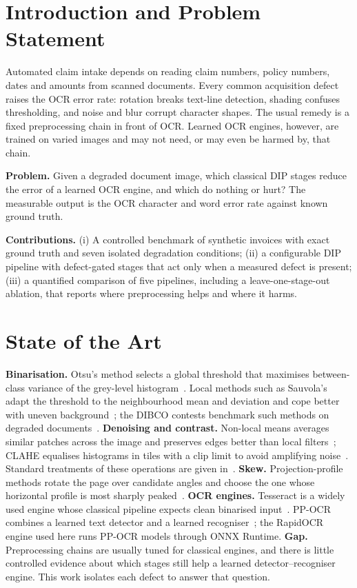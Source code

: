 \documentclass[conference]{IEEEtran}
\begin{document}
\section{Introduction and Problem Statement}
Automated claim intake depends on reading claim numbers, policy numbers, dates and amounts from scanned documents. Every common acquisition defect raises the OCR error rate: rotation breaks text-line detection, shading confuses thresholding, and noise and blur corrupt character shapes. The usual remedy is a fixed preprocessing chain in front of OCR. Learned OCR engines, however, are trained on varied images and may not need, or may even be harmed by, that chain.

\textbf{Problem.} Given a degraded document image, which classical DIP stages reduce the error of a learned OCR engine, and which do nothing or hurt? The measurable output is the OCR character and word error rate against known ground truth.

\textbf{Contributions.} (i) A controlled benchmark of synthetic invoices with exact ground truth and seven isolated degradation conditions; (ii) a configurable DIP pipeline with defect-gated stages that act only when a measured defect is present; (iii) a quantified comparison of five pipelines, including a leave-one-stage-out ablation, that reports where preprocessing helps and where it harms.

\section{State of the Art}
\textbf{Binarisation.} Otsu's method selects a global threshold that maximises between-class variance of the grey-level histogram~\cite{otsu1979}. Local methods such as Sauvola's adapt the threshold to the neighbourhood mean and deviation and cope better with uneven background~\cite{sauvola2000}; the DIBCO contests benchmark such methods on degraded documents~\cite{dibco2009}.
\textbf{Denoising and contrast.} Non-local means averages similar patches across the image and preserves edges better than local filters~\cite{buades2005}; CLAHE equalises histograms in tiles with a clip limit to avoid amplifying noise~\cite{zuiderveld1994}. Standard treatments of these operations are given in~\cite{gonzalez2018}.
\textbf{Skew.} Projection-profile methods rotate the page over candidate angles and choose the one whose horizontal profile is most sharply peaked~\cite{postl1986}.
\textbf{OCR engines.} Tesseract is a widely used engine whose classical pipeline expects clean binarised input~\cite{smith2007}. PP-OCR combines a learned text detector and a learned recogniser~\cite{du2020}; the RapidOCR engine used here runs PP-OCR models through ONNX Runtime.
\textbf{Gap.} Preprocessing chains are usually tuned for classical engines, and there is little controlled evidence about which stages still help a learned detector--recogniser engine. This work isolates each defect to answer that question.
\end{document}
